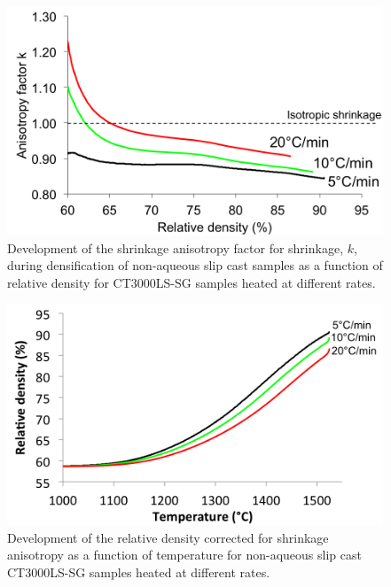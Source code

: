 \newpage
\begin{figure}[H]
	\centering
	\includegraphics[width=\textwidth]{Chapter-6/Figures/Figure2.png}
	\caption{Development of the shrinkage anisotropy factor for shrinkage, $k$, during densification of non-aqueous slip cast samples as a function of relative density for CT3000LS-SG samples heated at different rates.}
	\label{Ch6-figure:Figure2}
\end{figure}

\newpage
\begin{figure}[H]
	\centering
	\includegraphics[width=\textwidth]{Chapter-6/Figures/Figure3.png}
	\caption{Development of the relative density corrected for shrinkage anisotropy as a function of temperature for non-aqueous slip cast CT3000LS-SG samples heated at different rates.}
	\label{Ch6-figure:Figure3}
\end{figure}


